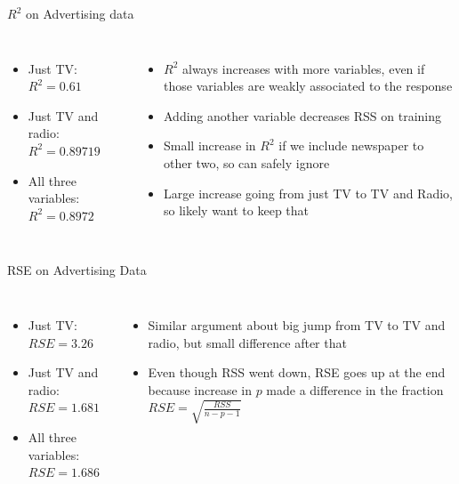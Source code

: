 \documentclass[aspectratio=169,usenames,dvipsnames]{beamer}
\newcommand{\InstructorList}[1]{
\begin{itemize}
	\color{orange}
	#1
\end{itemize}
}
\begin{document}
\begin{frame}[c]{$R^2$ on Advertising data}

\begin{columns}
\centering
\begin{itemize}
	\item Just TV: $R^2 = 0.61$
	\item Just TV and radio: $R^2 = 0.89719$
	\item All three variables: $R^2 = 0.8972$
\end{itemize}

\centering
\InstructorList{
\item $R^2$ always increases with more variables, even if those variables are weakly associated to the response
\item Adding another variable decreases RSS on training
\item Small increase in $R^2$ if we include newspaper to other two, so can safely ignore
\item Large increase going from just TV to TV and Radio, so likely want to keep that
}
\end{columns}

\end{frame}
\begin{frame}[c]{RSE on Advertising Data}

\begin{columns}
\centering
\centering
\begin{itemize}
	\item Just TV: $RSE = 3.26$
	\item Just TV and radio: $RSE = 1.681$
	\item All three variables: $RSE = 1.686$
\end{itemize}
\centering
\InstructorList{
\item Similar argument about big jump from TV to TV and radio, but small difference after that
\item Even though RSS went down, RSE goes up at the end because increase in $p$ made a difference in the fraction $RSE = \sqrt{\frac{RSS}{n- p - 1}}$
}
\end{columns}

\end{frame}
\end{document}
